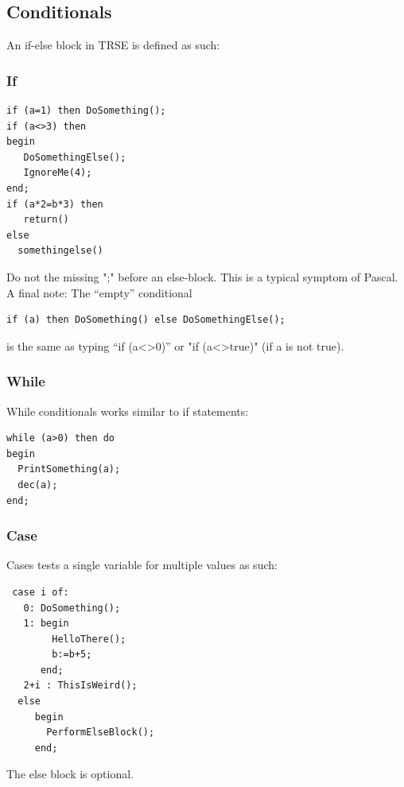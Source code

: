 \subsection{Conditionals}
An if-else block in TRSE is defined as such:
\subsubsection{If}
\begin{lstlisting}
if (a=1) then DoSomething();
if (a<>3) then 
begin
   DoSomethingElse();
   IgnoreMe(4);
end;
if (a*2=b*3) then 
   return() 
else
  somethingelse()
\end{lstlisting}
Do not the missing ";" before an else-block. This is a typical symptom of Pascal. 
A final note: The “empty” conditional
\begin{lstlisting}
if (a) then DoSomething() else DoSomethingElse();
\end{lstlisting}
is the same as typing “if (a<>0)” or "if (a<>true)" (if a is not true).
\subsubsection{While}
While conditionals works similar to if statements:
\begin{lstlisting}
while (a>0) then do 
begin
  PrintSomething(a);
  dec(a);
end;
\end{lstlisting}

\subsubsection{Case}
Cases tests a single variable for multiple values as such:
\begin{lstlisting}
 case i of:
   0: DoSomething();
   1: begin 
        HelloThere();
        b:=b+5;
      end;
   2+i : ThisIsWeird();
  else 
     begin
       PerformElseBlock();
     end;
\end{lstlisting}
The else block is optional.

